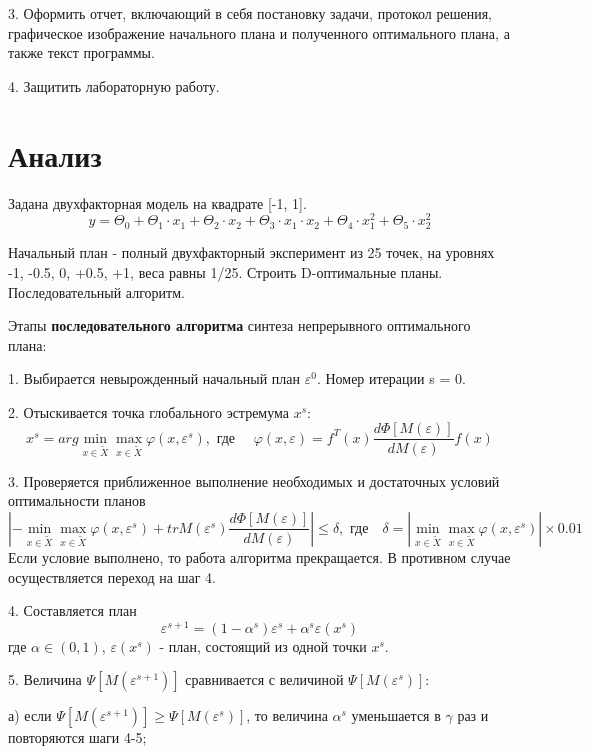 3.	Оформить отчет, включающий в себя постановку задачи, протокол решения, графическое изображение начального плана и полученного оптимального плана, а также текст программы.

4.	Защитить лабораторную работу.


\section{Анализ}

Задана двухфакторная модель на квадрате [-1, 1].
\[ y = \Theta_0 + \Theta_1 \cdot x_1 + \Theta_2 \cdot x_2 + 
\Theta_3 \cdot x_1 \cdot x_2 + \Theta_4 \cdot x_1^2 + \Theta_5 \cdot x_2^2 \]

Начальный план - полный двухфакторный эксперимент из 25 точек, на уровнях -1, -0.5, 0, +0.5, +1, веса равны 1/25.
Строить D-оптимальные планы. Последовательный алгоритм.


Этапы {\bf последовательного алгоритма} синтеза непрерывного оптимального плана:

1. Выбирается невырожденный начальный план $\varepsilon^0$. Номер итерации s = 0.

2. Отыскивается точка глобального эстремума $x^s$:
\[ x^s = arg \min_{x \in \tilde{X}} \max_{x \in \tilde{X}} \varphi(x, \varepsilon^s), \text{ где } \quad \varphi(x, \varepsilon) = f^T(x) \frac{d\Phi [M(\varepsilon)] }{ dM(\varepsilon) } f(x) \]

3. Проверяется приближенное выполнение необходимых и достаточных условий оптимальности планов
\[ \left| - \min_{x \in \tilde{X}} \max_{x \in \tilde{X}} \varphi(x, \varepsilon^s)
 + tr M(\varepsilon^s)  \frac{d\Phi [M(\varepsilon)] }{ dM(\varepsilon) } \right| \leq \delta,
\text{ где} \quad \delta = \left| \min_{x \in \tilde{X}} \max_{x \in \tilde{X}} \varphi(x, \varepsilon^s) \right| \times 0.01 \]
Если условие выполнено, то работа алгоритма прекращается. В противном случае осуществляется переход на шаг 4.

4. Составляется план
\[ \varepsilon^{s+1} = (1 - \alpha^s) \varepsilon^s + \alpha^s \varepsilon(x^s)\]
где $\alpha \in (0,1)$, $\varepsilon(x^s)$ - план, состоящий из одной точки $x^s$.


5. Величина $\Psi[M(\varepsilon^{s+1})]$ сравнивается с величиной $\Psi[M(\varepsilon^{s})]$:

а) если $\Psi[M(\varepsilon^{s+1})] \geq \Psi[M(\varepsilon^{s})]$, то величина $\alpha^s$ уменьшается в
$\gamma$ раз и повторяются шаги 4-5;

